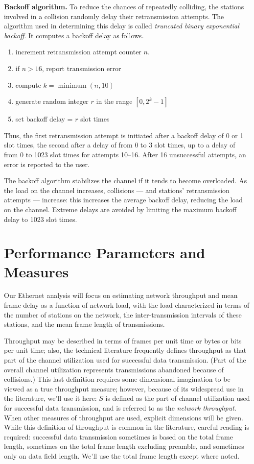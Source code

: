 \noindent\textbf{Backoff algorithm.} To reduce the chances of repeatedly colliding, the stations involved in a collision randomly delay their retransmission attempts. The algorithm used in determining this delay is called \emph{truncated binary exponential backoff}. It computes a backoff delay as follows.
\begin{enumerate}
\item increment retransmission attempt counter $n$.
\item if $n>16$, report transmission error
\item compute $k=\operatorname{minimum}(n,10)$
\item generate random integer $r$ in the range $[0,2^k-1]$
\item set backoff delay = $r$ slot times
\end{enumerate}
Thus, the first retransmission attempt is initiated after a backoff delay of 0 or 1 slot times, the second after a delay of from 0 to 3 slot times, up to a delay of from 0 to 1023 slot times for attempts 10--16. After 16 unsuccessful attempts, an error is reported to the user.

The backoff algorithm stabilizes the channel if it tends to become overloaded. As the load on the channel increases, collisions --- and stations' retransmission attempts --- increase: this increases the average backoff delay, reducing the load on the channel. Extreme delays are avoided by limiting the maximum backoff delay to 1023 slot times.

\section{Performance Parameters and Measures}

Our Ethernet analysis will focus on estimating network throughput and mean frame delay as a function of network load, with the load characterized in terms of the number of stations on the network, the inter-transmission intervals of these stations, and the mean frame length of transmissions.

Throughput may be described in terms of frames per unit time or bytes or bits per unit time; also, the technical literature frequently defines throughput as that part of the channel utilization used for successful data transmission. (Part of the overall channel utilization represents transmissions abandoned because of collisions.) This last definition requires some dimensional imagination to be viewed as a true throughput measure; however, because of its widespread use in the literature, we'll use it here: $S$ is defined as the part of channel utilization used for successful data transmission, and is referred to as the \emph{network throughput}. When other measures of throughput are used, explicit dimensions will be given. While this definition of throughput is common in the literature, careful reading is required: successful data transmission sometimes is based on the total frame length, sometimes on the total frame length excluding preamble, and sometimes only on data field length. We'll use the total frame length except where noted.

